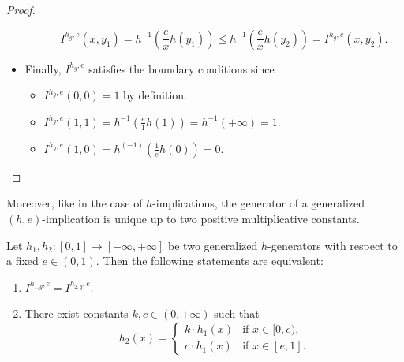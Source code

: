 \begin{proof}
\begin{itemize}
\begin{itemize}
			$$I^{h_g,e}(x,y_1)=h^{-1}\left( \frac{e}{x}h(y_1)\right) \leq 
			h^{-1}\left( \frac{e}{x}h(y_2) \right) = I^{h_g,e}(x,y_2).$$
		\end{itemize}
		\item Finally, $I^{h_g,e}$ satisfies the boundary conditions since
		\begin{itemize}
			\item $I^{h_g,e}(0,0)=1$ by definition.
			\item $I^{h_g,e}(1,1)= h^{-1}\left(\frac{e}{1}h(1)\right) = h^{-1}(+\infty)=1$.
			\item $I^{h_g,e}(1,0)=h^{(-1)}\left(\frac{1}{e}h(0)\right) = 0$.
		\end{itemize}
	\end{itemize}
\end{proof}

Moreover, like in the case of $h$-implications, the generator of a generalized $(h,e)$-implication
is unique up to two positive multiplicative constants.

\begin{proposition}
	Let $h_1, h_2:[0,1] \to [-\infty,+\infty]$ be two generalized $h$-generators with respect to a fixed $e \in (0,1)$. Then the following statements are equivalent:
	\begin{enumerate}[label=(\roman*)]
		\item $I^{h_{1,g},e}=I^{h_{2,g},e}$.
		\item There exist constants $k,c \in (0,+\infty)$ such that
		$$h_2(x)
		=
		\left\{ \begin{array}{ll}
			k \cdot h_1(x) &   \text{if }   x \in [0,e), \\
			c \cdot h_1(x) &   \text{if }  x \in [e,1].
		\end{array} \right.	
		$$
	\end{enumerate} 
\end{proposition}

